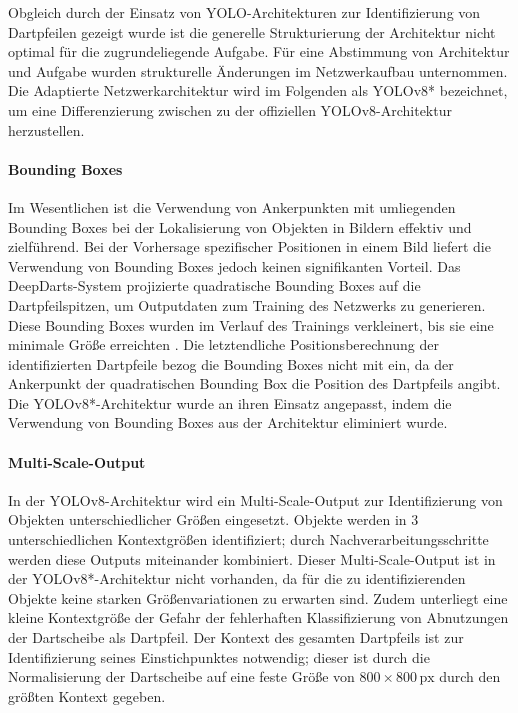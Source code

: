 Obgleich durch \citeauthor{deepdarts} der Einsatz von YOLO-Architekturen zur Identifizierung von Dartpfeilen gezeigt wurde ist die generelle Strukturierung der Architektur nicht optimal für die zugrundeliegende Aufgabe. Für eine Abstimmung von Architektur und Aufgabe wurden strukturelle Änderungen im Netzwerkaufbau unternommen. Die Adaptierte Netzwerkarchitektur wird im Folgenden als YOLOv8* bezeichnet, um eine Differenzierung zwischen zu der offiziellen YOLOv8-Architektur herzustellen.

\paragraph{Bounding Boxes}

Im Wesentlichen ist die Verwendung von Ankerpunkten mit umliegenden Bounding Boxes bei der Lokalisierung von Objekten in Bildern effektiv und zielführend. Bei der Vorhersage spezifischer Positionen in einem Bild liefert die Verwendung von Bounding Boxes jedoch keinen signifikanten Vorteil. Das DeepDarts-System projizierte quadratische Bounding Boxes auf die Dartpfeilspitzen, um Outputdaten zum Training des Netzwerks zu generieren. Diese Bounding Boxes wurden im Verlauf des Trainings verkleinert, bis sie eine minimale Größe erreichten \cite{deepdarts}. Die letztendliche Positionsberechnung der identifizierten Dartpfeile bezog die Bounding Boxes nicht mit ein, da der Ankerpunkt der quadratischen Bounding Box die Position des Dartpfeils angibt. Die YOLOv8*-Architektur wurde an ihren Einsatz angepasst, indem die Verwendung von Bounding Boxes aus der Architektur eliminiert wurde.

\paragraph{Multi-Scale-Output}

In der YOLOv8-Architektur wird ein Multi-Scale-Output zur Identifizierung von Objekten unterschiedlicher Größen eingesetzt. Objekte werden in 3 unterschiedlichen Kontextgrößen identifiziert; durch Nachverarbeitungsschritte werden diese Outputs miteinander kombiniert. Dieser Multi-Scale-Output ist in der YOLOv8*-Architektur nicht vorhanden, da für die zu identifizierenden Objekte keine starken Größenvariationen zu erwarten sind. Zudem unterliegt eine kleine Kontextgröße der Gefahr der fehlerhaften Klassifizierung von Abnutzungen der Dartscheibe als Dartpfeil. Der Kontext des gesamten Dartpfeils ist zur Identifizierung seines Einstichpunktes notwendig; dieser ist durch die Normalisierung der Dartscheibe auf eine feste Größe von $800 \times 800\,\text{px}$ durch den größten Kontext gegeben.

